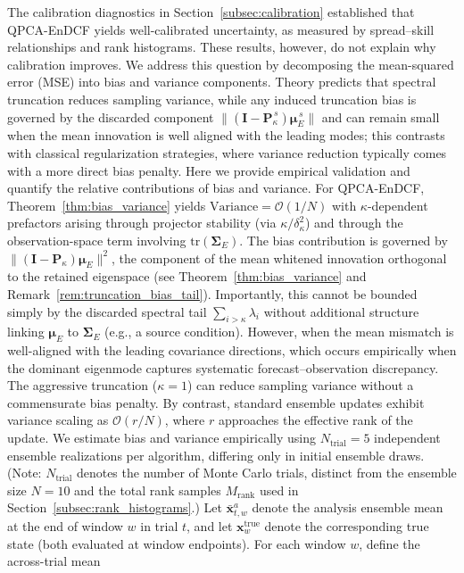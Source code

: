 \documentclass[11pt,a4paper]{article}
\begin{document}
The calibration diagnostics in Section~\ref{subsec:calibration} established that QPCA-EnDCF yields well-calibrated uncertainty, as measured by spread--skill relationships and rank histograms. These results, however, do not explain why calibration improves. We address this question by decomposing the mean-squared error (MSE) into bias and variance components. Theory predicts that spectral truncation reduces sampling variance, while any induced truncation bias is governed by the discarded component $\|(\mathbf{I}-\mathbf{P}_\kappa^{\,s})\boldsymbol{\mu}_E^{\,s}\|$ and can remain small when the mean innovation is well aligned with the leading modes; this contrasts with classical regularization strategies, where variance reduction typically comes with a more direct bias penalty. Here we provide empirical validation and quantify the relative contributions of bias and variance. For QPCA-EnDCF, Theorem~\ref{thm:bias_variance} yields $\mathrm{Variance}=\mathcal{O}(1/N)$ with $\kappa$-dependent prefactors arising through projector stability (via $\kappa/\delta_\kappa^2$) and through the observation-space term involving $\mathrm{tr}(\boldsymbol{\Sigma}_E)$. The bias contribution is governed by $\|(\mathbf{I}-\mathbf{P}_\kappa)\boldsymbol{\mu}_E\|^2$, the component of the mean whitened innovation orthogonal to the retained eigenspace (see Theorem~\ref{thm:bias_variance} and Remark~\ref{rem:truncation_bias_tail}). Importantly, this cannot be bounded simply by the discarded spectral tail $\sum_{i>\kappa}\lambda_i$ without additional structure linking $\boldsymbol{\mu}_E$ to $\boldsymbol{\Sigma}_E$ (e.g., a source condition). However, when the mean mismatch is well-aligned with the leading covariance directions, which occurs empirically when the dominant eigenmode captures systematic forecast--observation discrepancy. The aggressive truncation ($\kappa=1$) can reduce sampling variance without a commensurate bias penalty. By contrast, standard ensemble updates exhibit variance scaling as $\mathcal{O}(r/N)$, where $r$ approaches the effective rank of the update. We estimate bias and variance empirically using $N_{\mathrm{trial}}=5$ independent ensemble realizations per algorithm, differing only in initial ensemble draws. (Note: $N_{\mathrm{trial}}$ denotes the number of Monte Carlo trials, distinct from the ensemble size $N=10$ and the total rank samples $M_{\mathrm{rank}}$ used in Section~\ref{subsec:rank_histograms}.) Let $\bar{\mathbf{x}}_{t,w}^a$ denote the analysis ensemble mean at the end of window $w$ in trial $t$, and let $\mathbf{x}_{w}^{\mathrm{true}}$ denote the corresponding true state (both evaluated at window endpoints). For each window $w$, define the across-trial mean
\end{document}
